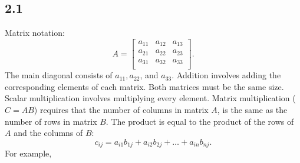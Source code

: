 \documentclass{article}
\begin{document}
    \subsection*{2.1}
    Matrix notation:
    \[
    A = 
    \begin{bmatrix}
        a_{11} & a_{12} & a_{13} \\
        a_{21} & a_{22} & a_{23} \\
        a_{31} & a_{32} & a_{33} \\
    \end{bmatrix}.
    \]
    The main diagonal consists of $a_{11}, a_{22}$, and $a_{33}$.
    Addition involves adding the corresponding elements of each matrix. 
    Both matrices must be the same size.
    Scalar multiplication involves multiplying every element. 
    Matrix multiplication ($C = AB$) requires that the number of columns in matrix $A$,
    is the same as the number of rows in matrix $B$. 
    The product is equal to the product of the rows of $A$ and the columns of $B$:
    \[
    c_{ij} = a_{i1}b_{1j} + a_{i2}b_{2j} + \dots + a_{in}b_{nj}.
    \]
    For example, 
\end{document}
